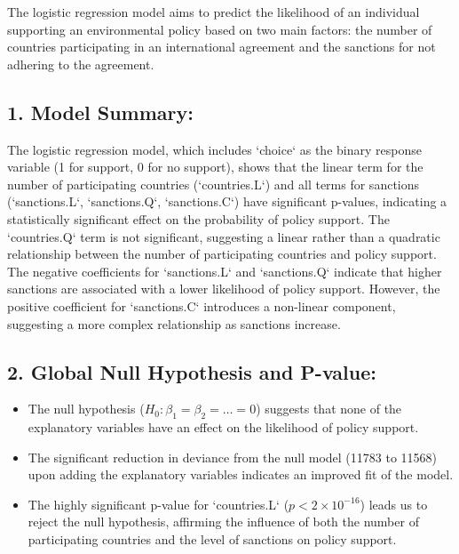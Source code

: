 \documentclass[12pt,letterpaper]{article}
\begin{document}
The logistic regression model aims to predict the likelihood of an individual supporting an environmental policy based on two main factors: the number of countries participating in an international agreement and the sanctions for not adhering to the agreement.

\subsection*{1. Model Summary:}
The logistic regression model, which includes `choice` as the binary response variable (1 for support, 0 for no support), shows that the linear term for the number of participating countries (`countries.L`) and all terms for sanctions (`sanctions.L`, `sanctions.Q`, `sanctions.C`) have significant p-values, indicating a statistically significant effect on the probability of policy support. The `countries.Q` term is not significant, suggesting a linear rather than a quadratic relationship between the number of participating countries and policy support. The negative coefficients for `sanctions.L` and `sanctions.Q` indicate that higher sanctions are associated with a lower likelihood of policy support. However, the positive coefficient for `sanctions.C` introduces a non-linear component, suggesting a more complex relationship as sanctions increase.

\subsection*{2. Global Null Hypothesis and P-value:}
\begin{itemize}
   \item The null hypothesis ($H_0: \beta_1 = \beta_2 = \ldots = 0$) suggests that none of the explanatory variables have an effect on the likelihood of policy support.
   \item The significant reduction in deviance from the null model (11783 to 11568) upon adding the explanatory variables indicates an improved fit of the model.
   \item The highly significant p-value for `countries.L` ($p < 2 \times 10^{-16}$) leads us to reject the null hypothesis, affirming the influence of both the number of participating countries and the level of sanctions on policy support.
\end{itemize}
\end{document}
